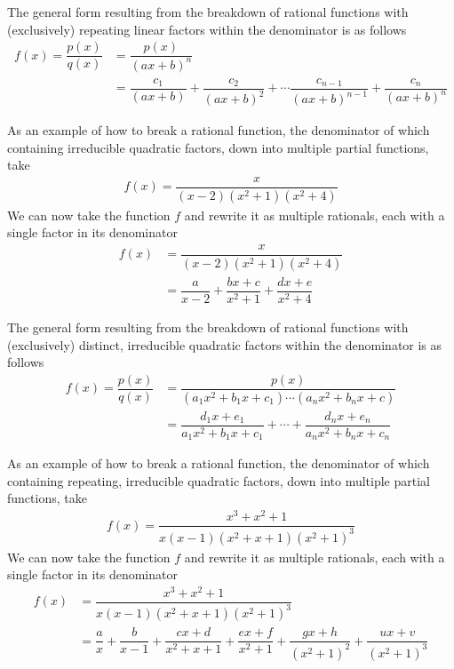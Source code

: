 \begin{example}
The general form resulting from the breakdown of rational functions with (exclusively) repeating linear factors within the denominator is as follows
\begin{align*}
    f(x) = \dfrac{p(x)}{q(x)} &= \dfrac{p(x)}{(ax + b)^{n}}\\[2ex]
    &= \dfrac{c_{1}}{(ax + b)} + \dfrac{c_{2}}{(ax + b)^{2}} + \cdots \dfrac{c_{n-1}}{(ax + b)^{n-1}} + \dfrac{c_{n}}{(ax + b)^{n}}
\end{align*}
\end{example}

\begin{example}
As an example of how to break a rational function, the denominator of which containing irreducible quadratic factors, down into multiple partial functions, take
\begin{align*}
    f(x) = \dfrac{x}{(x-2)(x^{2} + 1)(x^{2} + 4)}
\end{align*}
We can now take the function $f$ and rewrite it as multiple rationals, each with a single factor in its denominator
\begin{align*}
    f(x) &= \dfrac{x}{(x-2)(x^{2} + 1)(x^{2} + 4)}\\[2ex]
    &= \dfrac{a}{x-2} + \dfrac{bx + c}{x^{2} + 1} + \dfrac{dx + e}{x^{2} + 4}
\end{align*}
\end{example}

\begin{example}
The general form resulting from the breakdown of rational functions with (exclusively) distinct, irreducible quadratic factors within the denominator is as follows
\begin{align*}
    f(x) = \dfrac{p(x)}{q(x)} &= \dfrac{p(x)}{(a_{1}x^{2} + b_{1}x + c_{1}) \cdots (a_{n}x^{2} + b_{n}x + c)}\\[2ex]
    &= \dfrac{d_{1}x + e_{1}}{a_{1}x^{2} + b_{1}x + c_{1}} + \cdots + \dfrac{d_{n}x + e_{n}}{a_{n}x^{2} + b_{n}x + c_{n}}
\end{align*}
\end{example}

\begin{example}
As an example of how to break a rational function, the denominator of which containing repeating, irreducible quadratic factors, down into multiple partial functions, take
\begin{align*}
    f(x) = \dfrac{x^{3} + x^{2} + 1}{x(x-1)(x^{2} + x + 1)(x^{2} + 1)^{3}}
\end{align*}
We can now take the function $f$ and rewrite it as multiple rationals, each with a single factor in its denominator
\begin{align*}
    f(x) &= \dfrac{x^{3} + x^{2} + 1}{x(x-1)(x^{2} + x + 1)(x^{2} + 1)^{3}}\\[2ex]
    &= \dfrac{a}{x} + \dfrac{b}{x-1} + \dfrac{cx + d}{x^{2} + x + 1} + \dfrac{ex + f}{x^{2} + 1} + \dfrac{gx + h}{(x^{2} + 1)^{2}} + \dfrac{ux + v}{(x^{2} + 1)^{3}}
\end{align*}
\end{example}

